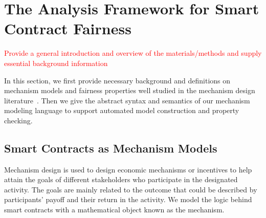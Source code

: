 










\section{The Analysis Framework for Smart Contract Fairness}
\label{section:mechanism_property}

\textcolor{red}{Provide a general introduction and overview of the materials/methods and supply essential background information}

In this section, we first provide necessary background and definitions on mechanism models and
fairness properties well studied in the mechanism design
literature~\cite{jackson2014mechanism,nisan2001algorithmic}.
Then we give the abstract syntax and semantics of our mechanism modeling language to support
automated model construction and property checking.

\subsection{Smart Contracts as Mechanism Models}\label{sec:mechanism-model}
Mechanism design is used to design economic mechanisms or incentives to help attain the goals of
different stakeholders who participate in the designated activity.
The goals are mainly related to the outcome that could be described by participants' payoff and
their return in the activity.
We model the logic behind smart contracts with a mathematical object known as the mechanism.

